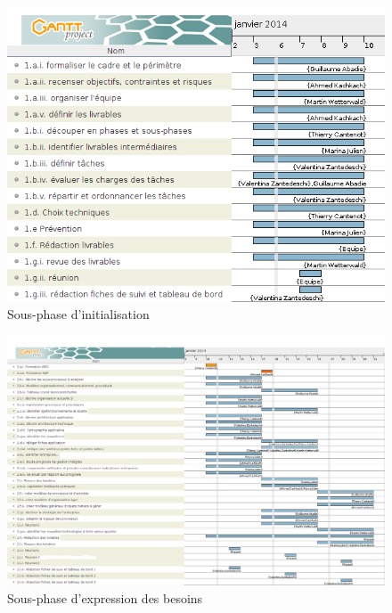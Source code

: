 \begin{figure}[h]
    \centering
    \includegraphics[scale=0.8]{images/Gantt_1.png}
    \caption{Sous-phase d'initialisation}
    \label{diagram:si_map}
\end{figure}

\begin{figure}[h]
    \centering
    \includegraphics[width=150mm]{images/Gantt_2.png}
    \caption{Sous-phase d'expression des besoins}
    \label{diagram:si_map}
\end{figure}

